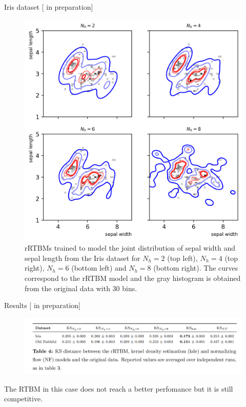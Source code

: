 \documentclass[10pt]{beamer}
\begin{document}
\begin{frame}{Iris dataset \hfill \small [\cite{new} in preparation]}

    \begin{figure}
        \includegraphics[scale=0.7]{figures/iris.png}
       
            \caption{rRTBMs trained to model the joint 
            distribution of sepal width and sepal length from the Iris dataset for $N_h = 2$ (top left), $N_h = 4$ (top right), $N_h = 6$ (bottom left) and $N_h = 8$ (bottom right).
                 The curves correspond to the rRTBM model and the gray histogram is obtained from the original data with 30 bins.}
    \end{figure}
    
    
\end{frame}

\begin{frame}{Results \hfill \small [\cite{new} in preparation]}
    \begin{figure}
        \includegraphics[scale=0.2]{figures/Screenshot from 2022-09-04 16-46-31.png}
    \end{figure}
    
    The RTBM in this case does not reach a better perfomance but it is still competitive.
\end{frame}
\end{document}
